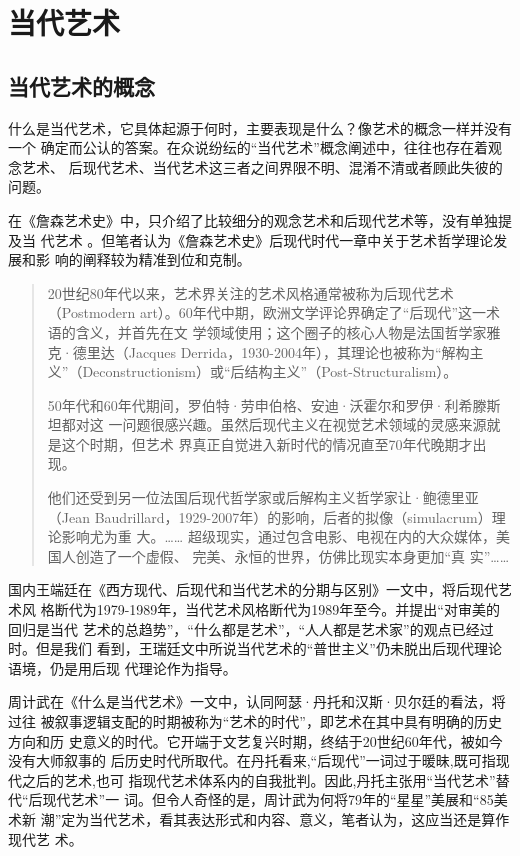 \chapter{当代艺术}

\section{当代艺术的概念}

什么是当代艺术，它具体起源于何时，主要表现是什么？像艺术的概念一样并没有一个
确定而公认的答案。在众说纷纭的“当代艺术”概念阐述中，往往也存在着观念艺术、
后现代艺术、当代艺术这三者之间界限不明、混淆不清或者顾此失彼的问题。

在《詹森艺术史》中，只介绍了比较细分的观念艺术和后现代艺术等，没有单独提及当
代艺术 。但笔者认为《詹森艺术史》后现代时代一章中关于艺术哲学理论发展和影
响的阐释较为精准到位和克制。

\begin{quotation}
  20世纪80年代以来，艺术界关注的艺术风格通常被称为后现代艺术（Postmodern
  art）。60年代中期，欧洲文学评论界确定了“后现代”这一术语的含义，并首先在文
  学领域使用；这个圈子的核心人物是法国哲学家雅克·德里达（Jacques
  Derrida，1930-2004年），其理论也被称为“解构主
  义”（Deconstructionism）或“后结构主义”（Post-Structuralism）。\medskip

  50年代和60年代期间，罗伯特·劳申伯格、安迪·沃霍尔和罗伊·利希滕斯坦都对这
  一问题很感兴趣。虽然后现代主义在视觉艺术领域的灵感来源就是这个时期，但艺术
  界真正自觉进入新时代的情况直至70年代晚期才出
  现。\medskip

  他们还受到另一位法国后现代哲学家或后解构主义哲学家让·鲍德里亚（Jean
  Baudrillard，1929-2007年）的影响，后者的拟像（simulacrum）理论影响尤为重
  大。…… 超级现实，通过包含电影、电视在内的大众媒体，美国人创造了一个虚假、
  完美、永恒的世界，仿佛比现实本身更加“真
  实”……
\end{quotation}

国内王端廷在《西方现代、后现代和当代艺术的分期与区别》一文中，将后现代艺术风
格断代为1979-1989年，当代艺术风格断代为1989年至今。并提出“对审美的回归是当代
艺术的总趋势”，“什么都是艺术”，“人人都是艺术家”的观点已经过时。但是我们
看到，王瑞廷文中所说当代艺术的“普世主义”仍未脱出后现代理论语境，仍是用后现
代理论作为指导。\cite{wangduanting}

周计武在《什么是当代艺术》一文中，认同阿瑟·丹托和汉斯·贝尔廷的看法，将过往
被叙事逻辑支配的时期被称为“艺术的时代”，即艺术在其中具有明确的历史方向和历
史意义的时代。它开端于文艺复兴时期，终结于20世纪60年代，被如今没有大师叙事的
后历史时代所取代。在丹托看来,“后现代”一词过于暖昧,既可指现代之后的艺术,也可
指现代艺术体系内的自我批判。因此,丹托主张用“当代艺术”替代“后现代艺术”一
词。\cite{whatsart}但令人奇怪的是，周计武为何将79年的“星星”美展和“85美术新
潮”定为当代艺术，看其表达形式和内容、意义，笔者认为，这应当还是算作现代艺
术。

